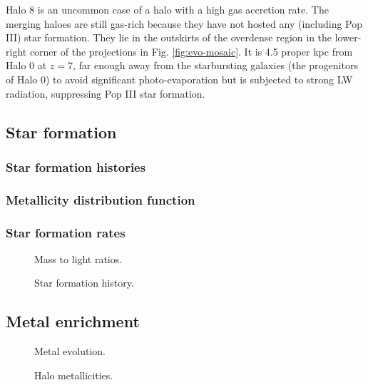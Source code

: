 \documentclass[useAMS,usenatbib]{mn2e}
\begin{document}
Halo 8 is an uncommon case of a halo with a high gas accretion rate.
The merging haloes are still gas-rich because they have not hosted any
(including Pop III) star formation.  They lie in the outskirts of the
overdense region in the lower-right corner of the projections in
Fig. \ref{fig:evo-mosaic}.  It is 4.5 proper kpc from Halo 0 at $z=7$,
far enough away from the starbursting galaxies (the progenitors of
Halo 0) to avoid significant photo-evaporation but is subjected to
strong LW radiation, suppressing Pop III star formation.

\subsection{Star formation}

\subsubsection{Star formation histories}

\subsubsection{Metallicity distribution function}

\subsubsection{Star formation rates}

\begin{figure}
  \caption{\label{fig:ML} Mass to light ratios.}
\end{figure}

\begin{figure*}
  \caption{\label{fig:SFR} Star formation history.}
\end{figure*}

\subsection{Metal enrichment}

\begin{figure}
  \caption{\label{fig:Zevo} Metal evolution.}
\end{figure}

\begin{figure}
  \caption{\label{fig:zhalo} Halo metallicities.}
\end{figure}
\end{document}
